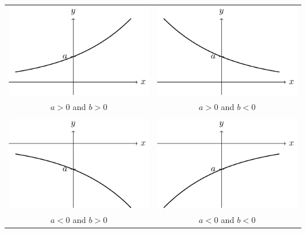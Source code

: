 \documentclass{standalone}
\begin{document}
\begin{tabular}{cc}
\includegraphics{exp1}
&
\includegraphics{exp2}
	\\
\(a>0\) and \(b>0\)
& \(a>0\) and \(b< 0\) \\
& \\
\includegraphics{exp3}
&
\includegraphics{exp4}
\\
\(a<0\) and \(b>0\)
& \(a<0\) and \(b< 0\) \\
\end{tabular}
\end{document}
